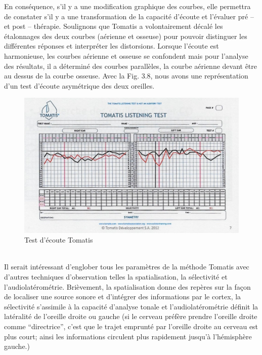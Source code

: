  En  conséquence,  s'il y a une modification
          graphique des courbes, elle
          permettra de constater s'il y a une transformation de la capacité d'écoute
          et l'évaluer pré -- et
          post -- thérapie.
Soulignons que Tomatis a volontairement décalé les étalonnages des deux courbes (aérienne et 
osseuse) pour pouvoir distinguer les différentes réponses et interpréter
	les distorsions. Lorsque l'écoute est harmonieuse, les
	courbes aérienne et osseuse se confondent mais pour l'analyse des
	résultats, il a déterminé des courbes parallèles, la courbe aérienne
	devant être au dessus de la courbe osseuse.
Avec la Fig. 3.8, nous avons une représentation d'un test
d'écoute asymétrique des deux oreilles.	
\begin{figure}
	\centering
	\includegraphics[width=0.8\linewidth]{images/tomatisListeningTest.jpg}
	\caption[Test d'écoute]{Test
          d'écoute Tomatis}
	\label{Test d'écoute asymétrique avec oreille droite et oreille gauche}
\end{figure}
\\
 Il serait intéressant d'englober tous les paramètres de la méthode Tomatis 
 avec d'autres techniques 
 d'observation telles la spatialisation, la sélectivité et l'audiolatérométrie. 
 Brièvement, la spatialisation donne des repères sur la façon de localiser une source sonore et d'intégrer 
 des informations par le cortex, la sélectivité s'assimile à la capacité d'analyse tonale %
 et l'audiolatérométrie définit la latéralité de l'oreille droite ou gauche (si le cerveau préfère prendre 
 l'oreille droite comme ``directrice'', c'est que le trajet emprunté par l'oreille droite au cerveau est plus 
 court; ainsi les informations circulent plus rapidement jusqu'à l'hémisphère gauche.)
